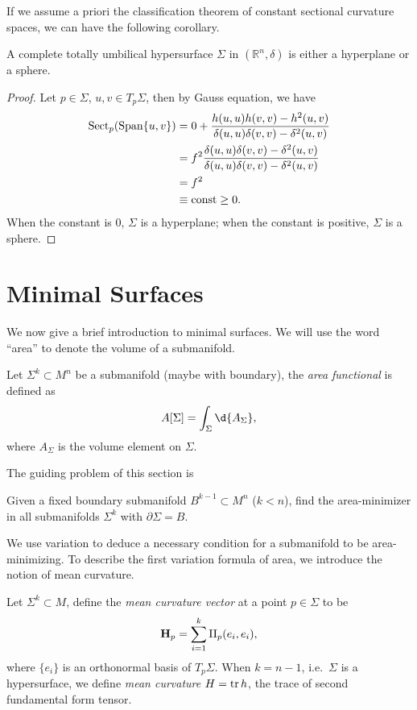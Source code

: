 If we assume a priori the classification theorem of constant sectional curvature spaces, we can have the following corollary.
\begin{cor}
    A complete totally umbilical hypersurface $\Sigma$ in $(\mathbb{R}^n,\delta)$ is either a hyperplane or a sphere.
\end{cor}
\begin{proof}
    Let $p\in\Sigma$, $u,v\in T_p\Sigma$, then by Gauss equation, we have
    \begin{align*}
        \operatorname{Sect}_p(\operatorname{Span}\{u,v\})&=0+\frac{h(u,u)h(v,v)-h^2(u,v)}{\delta(u,u)\delta(v,v)-\delta^2(u,v)}\\
        &=f^2\frac{\delta(u,u)\delta(v,v)-\delta^2(u,v)}{\delta(u,u)\delta(v,v)-\delta^2(u,v)}\\
        &=f^2\\
        &\equiv\text{const}\geq 0.
    \end{align*}
    When the constant is $0$, $\Sigma$ is a hyperplane; when the constant is positive, $\Sigma$ is a sphere.
\end{proof}

\section{Minimal Surfaces}

We now give a brief introduction to minimal surfaces.
We will use the word ``area'' to denote the volume of a submanifold.

\begin{defn}
    Let $\Sigma^k\subset M^n$ be a submanifold (maybe with boundary), the \emph{area functional} is defined as
    \[A[\Sigma]=\int_{\Sigma}\d{A_\Sigma},\]
    where $A_\Sigma$ is the volume element on $\Sigma$.
\end{defn}

The guiding problem of this section is
\begin{pro}
    Given a fixed boundary submanifold $B^{k-1}\subset M^n$ ($k<n$), find the area-minimi\-zer in all submanifolds $\Sigma^k$ with $\partial\Sigma=B$.
\end{pro}

We use variation to deduce a necessary condition for a submanifold to be area-minimizing.
To describe the first variation formula of area, we introduce the notion of mean curvature.

\begin{defn}
    Let $\Sigma^k\subset M$, define the \emph{mean curvature vector} at a point $p\in\Sigma$ to be
    \[\mathbf{H}_p=\sum_{i=1}^k\operatorname{II}_p(e_i,e_i),\]
    where $\{e_i\}$ is an orthonormal basis of $T_p\Sigma$.
    When $k=n-1$, i.e.\ $\Sigma$ is a hypersurface, we define \emph{mean curvature} $H=\operatorname{tr} h$, the trace of second fundamental form tensor.
\end{defn}

